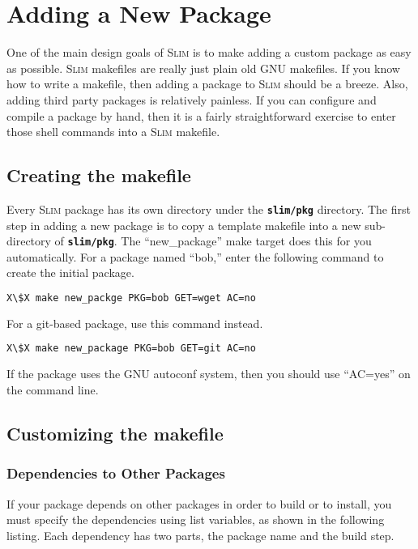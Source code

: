 \documentclass[a4paper,10pt]{article}
\newcommand{\slim}{\textsc{Slim}\xspace}
\newcommand{\fw}{\tt\bf}
\begin{document}
\section{Adding a New Package}

    One of the main design goals of \slim is to make adding a custom
    package as easy as possible. \slim makefiles are really just plain
    old GNU makefiles. If you know how to write a makefile, then
    adding a package to \slim should be a breeze. Also, adding third
    party packages is relatively painless. If you can configure and
    compile a package by hand, then it is a fairly straightforward
    exercise to enter those shell commands into a \slim makefile.

\subsection{Creating the makefile}\label{MakeNew}

    Every \slim package has its own directory under the {\fw slim/pkg}
    directory. The first step in adding a new package is to copy a
    template makefile into a new sub-directory of {\fw slim/pkg}. The
    ``new\_package'' make target does this for you automatically. For a
    package named ``bob,'' enter the following command to create the
    initial package.

\begin{lstlisting}[language=bash,escapechar=X]
X\$X make new_packge PKG=bob GET=wget AC=no
\end{lstlisting}

    For a git-based package, use this command instead.

\begin{lstlisting}[language=bash,escapechar=X]
X\$X make new_package PKG=bob GET=git AC=no
\end{lstlisting}

    If the package uses the GNU autoconf system, then you should use
    ``AC=yes'' on the command line.

\subsection{Customizing the makefile}

\subsubsection{Dependencies to Other Packages}

    If your package depends on other packages in order to build or to
    install, you must specify the dependencies using list variables,
    as shown in the following listing. Each dependency has two parts,
    the package name and the build step.
\end{document}
